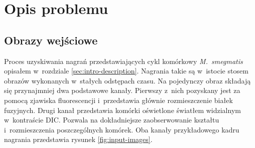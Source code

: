 \documentclass[declaration,shortabstract,mgr]{iithesis}
\begin{document}
\section{Opis problemu}
\label{sec:problem}

\subsection{Obrazy wejściowe}
\label{sec:input-images}

Proces uzyskiwania nagrań przedstawiających cykl komórkowy \emph{M.~smegmatis} opisałem w~rozdziale \ref{sec:intro-description}.
Nagrania takie są w~istocie stosem obrazów wykonanych w~stałych odstępach czasu.
Na pojedynczy obraz składają się przynajmniej dwa podstawowe kanały.
Pierwszy z~nich pozyskany jest za pomocą zjawiska fluorescencji i~przedstawia głównie rozmieszczenie białek fuzyjnych.
Drugi kanał przedstawia komórki oświetlone światłem widzialnym w~kontraście DIC.
Pozwala na dokładniejsze zaobserwowanie kształtu i~rozmieszczenia poszczególnych komórek.
Oba kanały przykładowego kadru nagrania przedstawia rysunek \ref{fig:input-images}.
\end{document}
